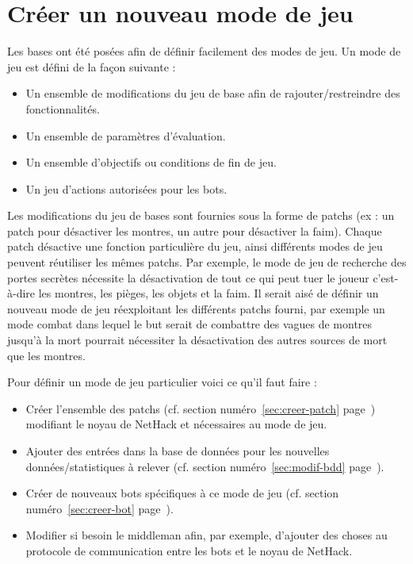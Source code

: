 \documentclass[10pt,a4paper]{report}
\begin{document}
\section{Créer un nouveau mode de jeu}
Les bases ont été posées afin de définir facilement des modes de jeu.
Un mode de jeu est défini de la façon suivante :
\begin{itemize}
		\item Un ensemble de modifications du jeu de base afin de
			rajouter/restreindre des fonctionnalités.
		\item Un ensemble de paramètres d'évaluation.
		\item Un ensemble d'objectifs ou conditions de fin de jeu.
		\item Un jeu d'actions autorisées pour les bots.
\end{itemize}

Les modifications du jeu de bases sont fournies sous la forme de patchs (ex :
un patch pour désactiver les montres, un autre pour désactiver la faim).
Chaque patch désactive une fonction particulière du jeu, ainsi différents
modes de jeu peuvent réutiliser les mêmes patchs. Par exemple, le mode de jeu
de recherche des portes secrètes nécessite la désactivation de tout ce qui
peut tuer le joueur c'est-à-dire les montres, les pièges, les objets et la
faim. Il serait aisé de définir un nouveau mode de jeu réexploitant les
différents patchs fourni, par exemple un mode combat dans lequel le but serait
de combattre des vagues de montres jusqu'à la mort pourrait nécessiter la
désactivation des autres sources de mort que les montres.

Pour définir un mode de jeu particulier voici ce qu'il faut faire :
\begin{itemize}
	\item Créer l'ensemble des patchs (cf. section numéro~\ref{sec:creer-patch} page~\pageref{sec:creer-patch}) modifiant le noyau de NetHack et nécessaires au mode de jeu.
	\item Ajouter des entrées dans la base de données pour les nouvelles données/statistiques à relever (cf. section numéro~\ref{sec:modif-bdd} page~\pageref{sec:modif-bdd}).
	\item Créer de nouveaux bots spécifiques à ce mode de jeu (cf. section numéro~\ref{sec:creer-bot} page~\pageref{sec:creer-bot}).
	\item Modifier si besoin le middleman afin, par exemple, d'ajouter des choses au protocole de communication entre les bots et le noyau de NetHack.
\end{itemize}
\end{document}
